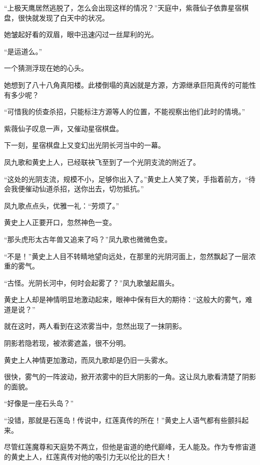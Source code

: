 
\begin{this_body}



“上极天鹰居然逃脱了，怎么会出现这样的情况？”天庭中，紫薇仙子依靠星宿棋盘，很快就发现了白天中的状况。

她皱起好看的双眉，眼中迅速闪过一丝犀利的光。

“是运道么。”

一个猜测浮现在她的心头。

她想到了八十八角真阳楼。此楼倒塌的真凶就是方源，方源继承巨阳真传的可能性有多少呢？

“可惜我的侦查杀招，只能标注方源等人的位置，不能视察出他们此时的情境。”

紫薇仙子叹息一声，又催动星宿棋盘。

下一刻，星宿棋盘上又变幻出光阴长河当中的一幕。

凤九歌和黄史上人，已经联袂飞至到了一个光阴支流的附近了。

“这处的光阴支流，规模不小，足够你出入了。”黄史上人笑了笑，手指着前方，“待会我便催动仙道杀招，送你出去，切勿抵抗。”

凤九歌点点头，优雅一礼：“劳烦了。”

黄史上人正要开口，忽然神色一变。

“那头虎形太古年兽又追来了吗？”凤九歌也微微色变。

“不是！”黄史上人目不转睛地望向远处，在那里的光阴河面上，忽然飘起了一层浓重的雾气。

“古怪。光阴长河中，何时会起雾了？”凤九歌皱起眉头。

黄史上人却是神情明显地激动起来，眼神中保有巨大的期待：“这般大的雾气，难道是说？”

就在这时，两人看到在这浓雾当中，忽然出现了一抹阴影。

阴影若隐若现，被浓雾遮盖，很不分明。

黄史上人神情更加激动，而凤九歌却是仍旧一头雾水。

很快，雾气的一阵波动，掀开浓雾中的巨大阴影的一角。这让凤九歌看清楚了阴影的面貌。

“好像是一座石头岛？”

“没错，那就是石莲岛！传说中，红莲真传的所在！”黄史上人语气都有些颤抖起来。

尽管红莲魔尊和天庭势不两立，但他是宙道的绝代巅峰，无人能及。作为专修宙道的黄史上人，红莲真传对他的吸引力无以伦比的巨大！


\end{this_body}
